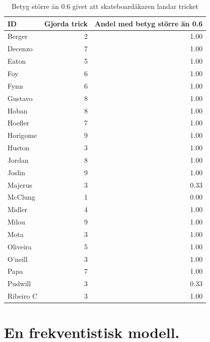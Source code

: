\documentclass{article}
\begin{document}
\begin{table}[htbp]
    \centering
    \begin{tabular}{lrr}
      \toprule
      \textbf{ID} & \textbf{Gjorda trick} & \textbf{Andel med betyg större än 0.6} \\
      \midrule
      Berger     &      2 &              1.00 \\
      Decenzo    &      7 &              1.00 \\
      Eaton      &      5 &              1.00 \\
      Foy        &      6 &              1.00 \\
      Fynn       &      6 &              1.00 \\
      Gustavo    &      8 &              1.00 \\
      Hoban      &      8 &              1.00 \\
      Hoefler    &      7 &              1.00 \\
      Horigome   &      9 &              1.00 \\
      Huston     &      3 &              1.00 \\
      Jordan     &      8 &              1.00 \\
      Joslin     &      9 &              1.00 \\
      Majerus    &      3 &              0.33 \\
      McClung    &      1 &              0.00 \\
      Midler     &      4 &              1.00 \\
      Milou      &      9 &              1.00 \\
      Mota       &      3 &              1.00 \\
      Oliveira   &      5 &              1.00 \\
      O’neill    &      3 &              1.00 \\
      Papa       &      7 &              1.00 \\
      Pudwill    &      3 &              0.33 \\
      Ribeiro C  &      3 &              1.00 \\
      \bottomrule
    \end{tabular}
    \caption{Betyg större än 0.6 givet att skateboardåkaren landar tricket}
    \label{tab:1d}
\end{table}
\newpage

\section{En frekventistisk modell.}
\end{document}
